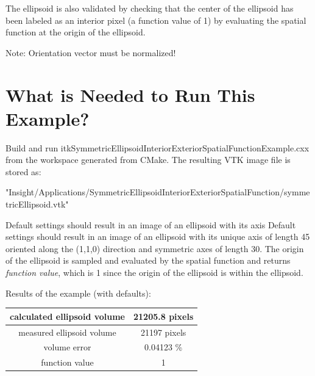 \documentclass{InsightHowto}
\begin{document}
The ellipsoid is also validated by checking that the center of the ellipsoid has been
labeled as an interior pixel (a function value of 1) by evaluating the spatial function at
the origin of the ellipsoid.

Note: Orientation vector must be normalized!

\section{What is Needed to Run This Example?}

Build and run itkSymmetricEllipsoidInteriorExteriorSpatialFunctionExample.cxx from the
workspace generated from CMake. The resulting VTK image file is stored as:

\begin{center}
"Insight/Applications/SymmetricEllipsoidInteriorExteriorSpatialFunction/symmetricEllipsoid.vtk"
\end{center}

Default settings should result in an image of an ellipsoid with its axis Default settings
should result in an image of an ellipsoid with its unique axis of length 45 oriented along
the (1,1,0) direction and symmetric axes of length 30. The origin of the ellipsoid is
sampled and evaluated by the spatial function and returns \emph{function value}, which is 1
since the origin of the ellipsoid is within the ellipsoid.

   \begin{center}
   Results of the example (with defaults):\\
   \begin{tabular}{|c|c|}  %
   \hline            %
   calculated ellipsoid volume & 21205.8 pixels \\
   \hline
   measured ellipsoid volume & 21197 pixels \\
   \hline
   volume error & 0.04123 \% \\
   \hline
   function value  &  1 \\
   \hline
   \end{tabular}
   \end{center}
\end{document}
